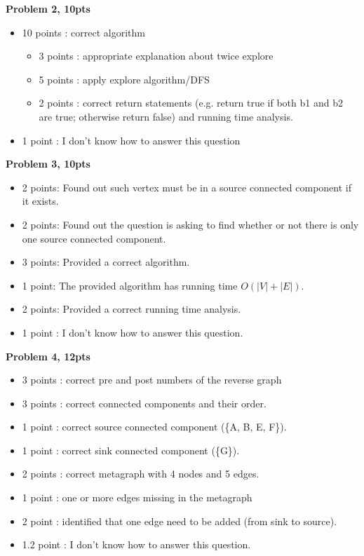 \documentclass[11pt]{article}
\begin{document}
\begin{qunlist}
{\bf Problem 2, 10pts}
\begin{itemize}
    \item 10 points : correct algorithm
    \begin{itemize} 
    \item 3 points : appropriate explanation about twice explore
    \item 5 points : apply explore algorithm/DFS
    \item 2 points : correct return statements (e.g. return true if both b1 and b2 are true; otherwise return false) and running time analysis.
    \end{itemize}
    \item 1 point : I don't know how to answer this question
\end{itemize}

{\bf Problem 3, 10pts}
\begin{itemize}
    \item 2 points: Found out such vertex must be in a source connected component if it exists.
    \item 2 points: Found out the question is asking to find whether or not there is only one source connected component.
    \item 3 points: Provided a correct algorithm.
    \item 1 point: The provided algorithm has running time $O(|V| + |E|)$.
    \item 2 points: Provided a correct running time analysis.
    \item 1 point : I don’t know how to answer this question.
\end{itemize}

{\bf Problem 4, 12pts}
\begin{itemize}
    \item 3 points : correct pre and post numbers of the reverse graph 
    \item 3 points : correct connected components and their order.
    \item 1 point : correct source connected component (\{A, B, E, F\}).
    \item 1 point : correct sink connected component (\{G\}).
    \item 2 points : correct metagraph with 4 nodes and 5 edges.
    \item 1 point : one or more edges missing in the metagraph
    \item 2 point : identified that one edge need to be added (from sink to source).
    \item 1.2 point : I don't know how to answer this question.
\end{itemize}

\end{qunlist}
\end{document}
